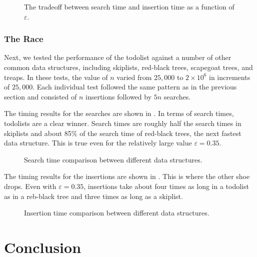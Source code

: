 \documentclass[lotsofwhite]{patmorin}
\newcommand{\eps}{\varepsilon}
\begin{document}
\begin{figure}
  \centering{}
  \caption{The tradeoff between search time and insertion time as a function of $\eps$.}
\end{figure}

\subsubsection{The Race}

Next, we tested the performance of the todolist against a number of
other common data structures, including skiplists, red-black trees,
scapegoat trees, and treaps. In these tests, the value of $n$ varied from
$25,000$ to $2\times 10^6$ in increments of $25,000$.   Each individual
test followed the same pattern as in the previous section and consisted
of $n$ insertions followed by $5n$ searches.

The timing results for the searches are shown in . In
terms of search times, todolists are a clear winner.  Search times are
roughly half the search times in skiplists and about 85\% of the search
time of red-black trees, the next fastest data structure.  This is true
even for the relatively large value $\eps=0.35$.

\begin{figure}
  \centering{}
  \caption{Search time comparison between different data structures.}
\end{figure}

The timing results for the insertions are shown in
. This is where the other shoe drops.  Even with
$\eps=0.35$, insertions take about four times as long in a todolist as
in a reb-black tree and three times as long as a skiplist.

\begin{figure}
  \centering{}
  \caption{Insertion time comparison between different data structures.}
\end{figure}



\section{Conclusion}
\end{document}
